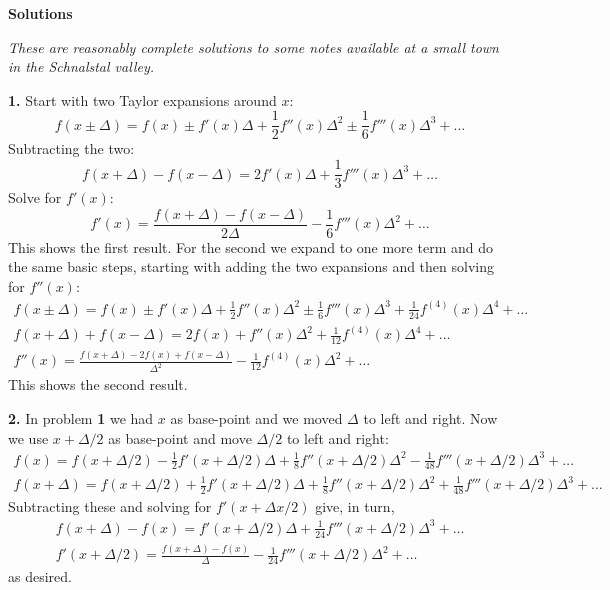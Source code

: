 \documentclass[10pt]{amsart}
\newcommand{\normalspacing}{\renewcommand{\baselinestretch}{1.05}
        \tiny\normalsize}
\newcommand{\prob}[1]{\bigskip\noindent\large\textbf{#1.}\normalsize }
\begin{document}
\Large\centerline{\textbf{Solutions}}

\medskip
\small
\centerline{\emph{These are reasonably complete solutions to some notes available at a small town in the Schnalstal valley.}}
\normalsize

\bigskip\bigskip

\thispagestyle{empty}
\normalspacing

\prob{1}  Start with two Taylor expansions around $x$:
    $$f(x\pm \Delta) = f(x) \pm f'(x) \Delta + \frac{1}{2} f''(x) \Delta^2 \pm \frac{1}{6} f'''(x) \Delta^3 + \dots$$
Subtracting the two:
    $$f(x+\Delta) - f(x-\Delta) = 2 f'(x) \Delta + \frac{1}{3} f'''(x) \Delta^3 + \dots$$
Solve for $f'(x)$:
    $$f'(x) = \frac{f(x+\Delta) - f(x-\Delta)}{2\Delta} - \frac{1}{6} f'''(x) \Delta^2 + \dots$$
This shows the first result.  For the second we expand to one more term and do the same basic steps, starting with adding the two expansions and then solving for $f''(x)$:
\begin{gather*}
    f(x\pm \Delta) = f(x) \pm f'(x) \Delta + \frac{1}{2} f''(x) \Delta^2 \pm \frac{1}{6} f'''(x) \Delta^3 + \frac{1}{24} f^{(4)}(x) \Delta^4 + \dots \\
    f(x + \Delta) + f(x - \Delta) = 2 f(x) + f''(x) \Delta^2 + \frac{1}{12} f^{(4)}(x) \Delta^4 + \dots \\
    f''(x) = \frac{f(x + \Delta) - 2 f(x) + f(x - \Delta)}{\Delta^2} - \frac{1}{12} f^{(4)}(x) \Delta^2 + \dots
\end{gather*}
This shows the second result.

\prob{2}  In problem \textbf{1} we had $x$ as base-point and we moved $\Delta$ to left and right.  Now we use $x+\Delta/2$ as base-point and move $\Delta/2$ to left and right:
\begin{gather*}
f(x) = f(x+\Delta/2) - \frac{1}{2} f'(x+\Delta/2) \Delta + \frac{1}{8} f''(x+\Delta/2) \Delta^2 - \frac{1}{48} f'''(x+\Delta/2) \Delta^3 + \dots \\
f(x+\Delta) = f(x+\Delta/2) + \frac{1}{2} f'(x+\Delta/2) \Delta + \frac{1}{8} f''(x+\Delta/2) \Delta^2 + \frac{1}{48} f'''(x+\Delta/2) \Delta^3 + \dots
\end{gather*}
Subtracting these and solving for $f'(x+\Delta x/2)$ give, in turn,
\begin{gather*}
f(x+\Delta) - f(x) = f'(x+\Delta/2) \Delta + \frac{1}{24} f'''(x+\Delta/2) \Delta^3 + \dots \\
f'(x+\Delta/2) = \frac{f(x+\Delta) - f(x)}{\Delta} - \frac{1}{24} f'''(x+\Delta/2) \Delta^2 + \dots
\end{gather*}
as desired.
\end{document}
